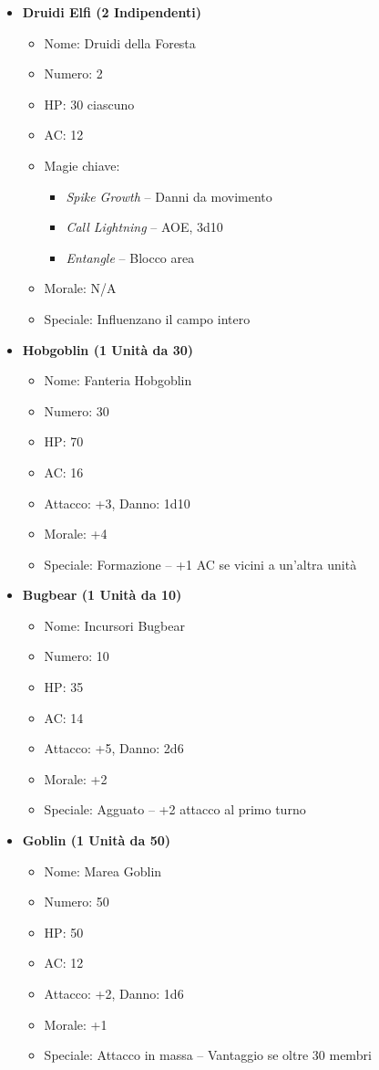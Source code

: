\documentclass{article}
\begin{document}
\begin{itemize}
  \item \textbf{Druidi Elfi (2 Indipendenti)}
  \begin{itemize}
    \item Nome: Druidi della Foresta
    \item Numero: 2
    \item HP: 30 ciascuno
    \item AC: 12
    \item Magie chiave:
    \begin{itemize}
      \item \textit{Spike Growth} – Danni da movimento
      \item \textit{Call Lightning} – AOE, 3d10
      \item \textit{Entangle} – Blocco area
    \end{itemize}
    \item Morale: N/A
    \item Speciale: Influenzano il campo intero
  \end{itemize}

  \item \textbf{Hobgoblin (1 Unità da 30)}
  \begin{itemize}
    \item Nome: Fanteria Hobgoblin
    \item Numero: 30
    \item HP: 70
    \item AC: 16
    \item Attacco: +3, Danno: 1d10
    \item Morale: +4
    \item Speciale: Formazione – +1 AC se vicini a un'altra unità
  \end{itemize}

  \item \textbf{Bugbear (1 Unità da 10)}
  \begin{itemize}
    \item Nome: Incursori Bugbear
    \item Numero: 10
    \item HP: 35
    \item AC: 14
    \item Attacco: +5, Danno: 2d6
    \item Morale: +2
    \item Speciale: Agguato – +2 attacco al primo turno
  \end{itemize}

  \item \textbf{Goblin (1 Unità da 50)}
  \begin{itemize}
    \item Nome: Marea Goblin
    \item Numero: 50
    \item HP: 50
    \item AC: 12
    \item Attacco: +2, Danno: 1d6
    \item Morale: +1
    \item Speciale: Attacco in massa – Vantaggio se oltre 30 membri
  \end{itemize}
\end{itemize}
\end{document}
